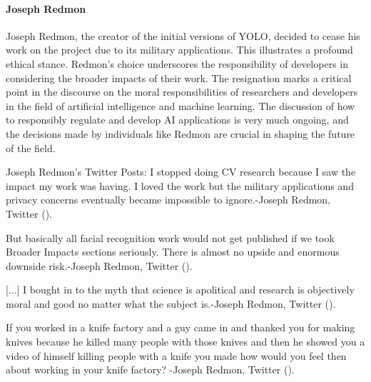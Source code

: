     
\paragraph{Joseph Redmon}
Joseph Redmon, the creator of the initial versions of YOLO, decided to cease his work on the project due to its military applications. This illustrates a profound ethical stance. Redmon's choice underscores the responsibility of developers in considering the broader impacts of their work. The resignation marks a critical point in the discourse on the moral responsibilities of researchers and developers in the field of artificial intelligence and machine learning. The discussion of how to responsibly regulate and develop AI applications is very much ongoing, and the decisions made by individuals like Redmon are crucial in shaping the future of the field.

\begin{myquote} {Joseph Redmon's Twitter Posts:}
    I stopped doing CV research because I saw the impact my work was having. I loved the work but the military applications and privacy concerns eventually became impossible to ignore.-Joseph Redmon, Twitter (\cite{re2020twitter_feb}).

    But basically all facial recognition work would not get published if we took Broader Impacts sections seriously. There is almost no upside and enormous downside risk.-Joseph Redmon, Twitter (\cite{re2020twitter_feb}).

    [...] I bought in to the myth that science is apolitical and research is objectively moral and good no matter what the subject is.-Joseph Redmon, Twitter (\cite{re2020twitter_feb}).


    If you worked in a knife factory and a guy came in and thanked you for making knives because he killed many people with those knives and then he showed you a video of himself killing people with a knife you made how would you feel then about working in your knife factory? -Joseph Redmon, Twitter (\cite{re2020twitter_june}).
\end{myquote}



